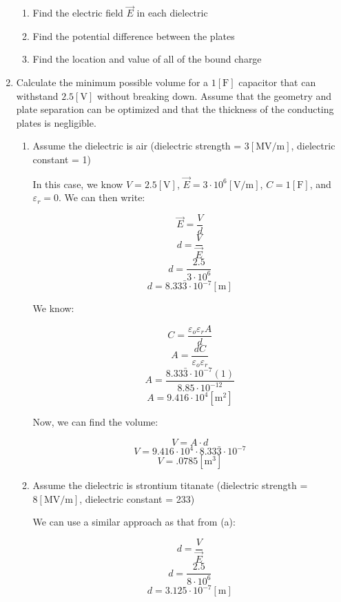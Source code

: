 \begin{enumerate}
\begin{enumerate}
      \item Find the electric field $\vec{E}$ in each dielectric

      \item Find the potential difference between the plates

      \item Find the location and value of all of the bound charge

    \end{enumerate}

  \item Calculate the minimum possible volume for a $1[\si{\farad}]$ capacitor that can withstand $2.5[\si{\volt}]$ without breaking down. Assume that the geometry and plate separation can be optimized and that the thickness of the conducting plates is negligible.

    \begin{enumerate}

      \item Assume the dielectric is air (dielectric strength = $3[\si{\mega\volt}/\si{\meter}]$, dielectric constant = 1)

        In this case, we know $V=2.5[\si{\volt}]$, $\vec{E}=3\cdot10^6[\si{\volt}/\si{\meter}]$, $C=1[\si{\farad}]$, and $\varepsilon_r=0$. We can then write:

        $$\vec{E}=\frac{V}{d}$$
        $$d=\frac{V}{\vec{E}}$$
        $$d=\frac{2.5}{3\cdot10^{6}}$$
        $$d=8.33\bar{3}\cdot10^{-7}[\si{\meter}]$$

        We know:

        $$C=\frac{\varepsilon_o\varepsilon_r A}{d}$$
        $$A=\frac{d C}{\varepsilon_o\varepsilon_r}$$
        $$A=\frac{8.33\bar{3}\cdot10^{-7}(1)}{8.85\cdot10^{-12}}$$
        $$A=9.416\cdot10^4[\si{\meter\squared}]$$

        Now, we can find the volume:

        $$V=A\cdot d$$
        $$V=9.416\cdot10^4\cdot 8.33\bar{3}\cdot10^{-7}$$
        $$\boxed{V=.0785[\si{\meter\cubed}]}$$

      \item Assume the dielectric is strontium titanate (dielectric strength = $8[\si{\mega\volt}/\si{\meter}]$, dielectric constant = 233)

        We can use a similar approach as that from (a):

        $$d=\frac{V}{\vec{E}}$$
        $$d=\frac{2.5}{8\cdot10^6}$$
        $$d=3.125\cdot10^{-7}[\si{\meter}]$$


\end{enumerate}
\end{enumerate}
